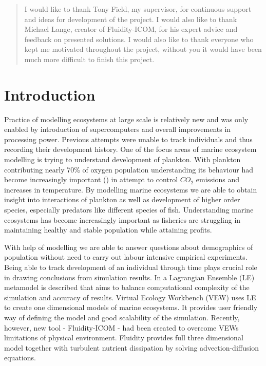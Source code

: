 \documentclass[12pt, a4paper]{report}
\renewcommand{\abstractname}{Abstract}
\newcommand*\NewPage{\newpage\hbox{}\thispagestyle{empty}\newpage}
\begin{document}
\renewcommand{\abstractname}{Acknowledgements}
\begin{abstract}
I would like to thank Tony Field, my supervisor, for continuous support and ideas
for development of the project. I would also like to thank Michael Lange, creator
of Fluidity-ICOM, for his expert advice and feedback on presented solutions.
I would also like to thank everyone who kept me motivated throughout the project,
without you it would have been much more difficult to finish this project.
\end{abstract}
\NewPage

\tableofcontents
\listoffigures
\listoftables
\lstlistoflistings

\chapter{Introduction}\label{ch:intro}
Practice of modelling ecosystems at large scale is relatively new and was
only enabled by introduction of supercomputers and overall improvements
in processing power. Previous attempts were unable to track individuals and thus
recording their development history. One of the focus areas of marine ecosystem
modelling is trying to understand development of plankton. With plankton contributing
nearly 70\% of oxygen population understanding its behaviour had become increasingly
important (\cite{Nogueira2006}) in attempt to control $CO_2$ emissions and increases in temperature.
By modelling marine ecosystems we are able to obtain insight into interactions
of plankton as well as development of higher order species, especially predators like
different species of fish. Understanding marine ecosystems has become increasingly
important as fisheries are struggling in maintaining healthy and stable population
while attaining profits.

With help of modelling we are able to answer questions about demographics of
population without need to carry out labour intensive empirical experiments.
Being able to track development of an individual through time plays crucial
role in drawing conclusions from simulation results. In \cite{Woods2005} a
Lagrangian Ensemble (LE) metamodel is described that aims to balance
computational complexity of the simulation and accuracy of results. Virtual
Ecology Workbench (VEW) uses LE to create one dimensional models of marine
ecosystems. It provides user friendly way of defining the model and good
scalability of the simulation. Recently, however, new tool - Fluidity-ICOM -
had been created to overcome VEWs limitations of physical environment.
Fluidity provides full three dimensional model together with turbulent
nutrient dissipation by solving advection-diffusion equations.
\end{document}

